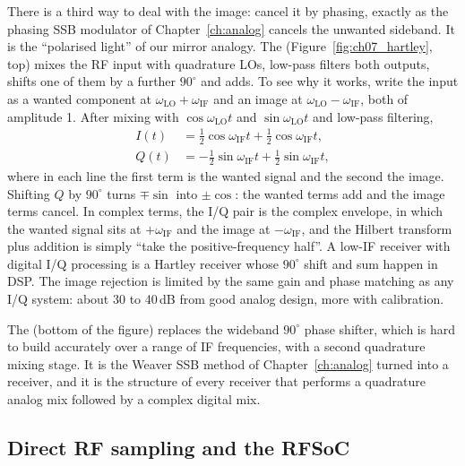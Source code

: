 There is a third way to deal with the image: cancel it by phasing, exactly as the phasing SSB modulator
of Chapter~\ref{ch:analog} cancels the unwanted sideband. It is the ``polarised light'' of our mirror
analogy. The  (Figure~\ref{fig:ch07_hartley}, top) mixes the RF input with
quadrature LOs, low-pass filters both outputs, shifts one of them by a further $90^\circ$ and adds. To
see why it works, write the input as a wanted component at $\omega_{\text{LO}}+\omega_{\text{IF}}$ and
an image at $\omega_{\text{LO}}-\omega_{\text{IF}}$, both of amplitude 1. After mixing with
$\cos\omega_{\text{LO}}t$ and $\sin\omega_{\text{LO}}t$ and low-pass filtering,
\begin{align}
I(t)&=\tfrac12\cos\omega_{\text{IF}}t+\tfrac12\cos\omega_{\text{IF}}t, \nonumber\\
Q(t)&=-\tfrac12\sin\omega_{\text{IF}}t+\tfrac12\sin\omega_{\text{IF}}t,
\end{align}
where in each line the first term is the wanted signal and the second the image. Shifting $Q$ by
$90^\circ$ turns $\mp\sin$ into $\pm\cos$: the wanted terms add and the image terms cancel. In complex
terms, the I/Q pair is the complex envelope, in which the wanted signal sits at $+\omega_{\text{IF}}$ and
the image at $-\omega_{\text{IF}}$, and the Hilbert transform plus addition is simply ``take the
positive-frequency half''. A low-IF receiver with digital I/Q processing is a Hartley receiver whose
$90^\circ$ shift and sum happen in DSP. The image rejection is limited by the same gain and phase
matching as any I/Q system: about 30 to 40\,dB from good analog design, more with calibration.

The  (bottom of the figure) replaces the wideband $90^\circ$ phase shifter,
which is hard to build accurately over a range of IF frequencies, with a second quadrature mixing stage.
It is the Weaver SSB method of Chapter~\ref{ch:analog} turned into a receiver, and it is the structure of
every receiver that performs a quadrature analog mix followed by a complex digital mix.

\subsection{Direct RF sampling and the RFSoC}

